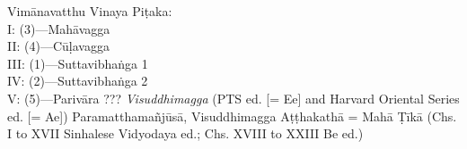 \begin{thebibliography}{xxxxxxxxxxx}
 Vimānavatthu
 Vinaya Piṭaka:\\ I: (3)—Mahāvagga \\ II: (4)—Cūḷavagga \\ III: (1)—Suttavibhaṅga 1 \\ IV: (2)—Suttavibhaṅga 2 \\ V: (5)—Parivāra
 ???
 \emph{Visuddhimagga} (PTS ed. [= Ee] and Harvard Oriental Series ed. [= Ae])
 Paramatthamañjūsā, Visuddhimagga Aṭṭhakathā = Mahā Ṭīkā (Chs. I to XVII Sinhalese Vidyodaya ed.; Chs. XVIII to XXIII Be ed.)
\end{thebibliography}

